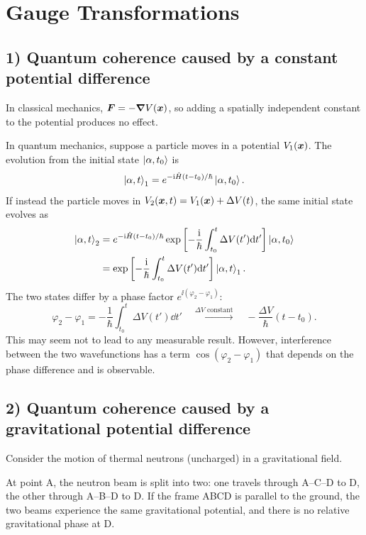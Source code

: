 \section{Gauge Transformations}
\subsection*{1) Quantum coherence caused by a constant potential difference}
In classical mechanics, $\bm{F}=-\bm{\nabla} V(\bm{x})$, so adding a spatially independent constant to the potential produces no effect.

In quantum mechanics, suppose a particle moves in a potential $V_1(\bm{x})$. The evolution from the initial state $\left|\alpha,t_0\right\rangle$ is
\begin{equation}
\left|\alpha,t\right\rangle_1=e^{-\mathrm{i}\hat{H}(t-t_0)/\hbar}\left|\alpha,t_0\right\rangle.
\end{equation}
If instead the particle moves in $V_2(\bm{x},t)=V_1(\bm{x})+\Delta V(t)$, the same initial state evolves as
\begin{equation}
\begin{split}
\left|\alpha,t\right\rangle_2
&=e^{-\mathrm{i}\hat{H}(t-t_0)/\hbar}
\exp\left[-\frac{\mathrm{i}}\hbar\int_{t_0}^{t}\Delta V(t')\mathrm{d} t'\right]\left|\alpha,t_0\right\rangle\\
&=\exp\left[-\frac{\mathrm{i}}\hbar\int_{t_0}^{t}\Delta V(t')\mathrm{d} t'\right]\left|\alpha,t\right\rangle_1.
\end{split}
\end{equation}
The two states differ by a phase factor $e^{\ii(\varphi_2-\varphi_1)}$:
\begin{equation}
\varphi_2-\varphi_1=-\frac1\hbar\int_{t_0}^{t}\Delta V(t')\dd t'
\quad\xrightarrow{\Delta V\text{ constant}}\quad
-\frac{\Delta V}{\hbar}(t-t_0).
\end{equation}
This may seem not to lead to any measurable result. However, interference between the two wavefunctions has a term $\cos(\varphi_2-\varphi_1)$ that depends on the phase difference and is observable.

\subsection*{2) Quantum coherence caused by a gravitational potential difference}
Consider the motion of thermal neutrons (uncharged) in a gravitational field.

At point A, the neutron beam is split into two: one travels through A--C--D to D, the other through A--B--D to D. If the frame ABCD is parallel to the ground, the two beams experience the same gravitational potential, and there is no relative gravitational phase at D.

